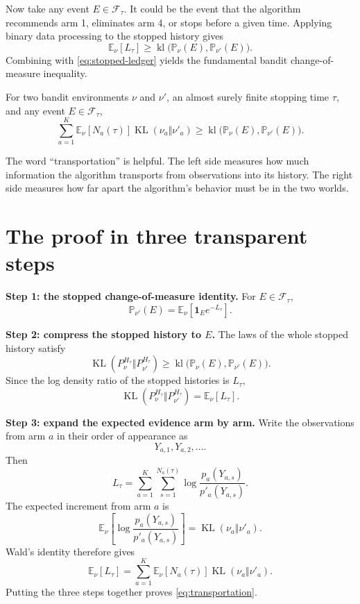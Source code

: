 \documentclass[en,nofont,11pt]{elegantbook}
\newcommand{\E}{\mathbb{E}}
\newcommand{\Pbb}{\mathbb{P}}
\newcommand{\one}{\mathbf{1}}
\newcommand{\KL}{\operatorname{KL}}
\newcommand{\kl}{\operatorname{kl}}
\newcommand{\calF}{\mathcal{F}}
\begin{document}
Now take any event $E\in\calF_\tau$. It could be the event that the algorithm recommends arm 1, eliminates arm 4, or stops before a given time. Applying binary data processing to the stopped history gives
\[
\E_\nu[L_\tau]
\geq
\kl\bigl(\Pbb_\nu(E),\Pbb_{\nu'}(E)\bigr).
\]
Combining with \eqref{eq:stopped-ledger} yields the fundamental bandit change-of-measure inequality.

\begin{resultbox}[title=Bandit transportation inequality]
For two bandit environments $\nu$ and $\nu'$, an almost surely finite stopping time $\tau$, and any event $E\in\calF_\tau$,
\begin{equation}
\boxed{
\sum_{a=1}^{K}
\E_\nu[N_a(\tau)]\KL(\nu_a\Vert\nu'_a)
\geq
\kl\bigl(\Pbb_\nu(E),\Pbb_{\nu'}(E)\bigr).
}
\label{eq:transportation}
\end{equation}
\end{resultbox}

The word ``transportation'' is helpful. The left side measures how much information the algorithm transports from observations into its history. The right side measures how far apart the algorithm's behavior must be in the two worlds.

\section{The proof in three transparent steps}

\textbf{Step 1: the stopped change-of-measure identity.}
For $E\in\calF_\tau$,
\[
\Pbb_{\nu'}(E)
=
\E_\nu\left[\one_E e^{-L_\tau}\right].
\]

\textbf{Step 2: compress the stopped history to $E$.}
The laws of the whole stopped history satisfy
\[
\KL(P_\nu^{H_\tau}\Vert P_{\nu'}^{H_\tau})
\geq
\kl\bigl(\Pbb_\nu(E),\Pbb_{\nu'}(E)\bigr).
\]
Since the log density ratio of the stopped histories is $L_\tau$,
\[
\KL(P_\nu^{H_\tau}\Vert P_{\nu'}^{H_\tau})
=
\E_\nu[L_\tau].
\]

\textbf{Step 3: expand the expected evidence arm by arm.}
Write the observations from arm $a$ in their order of appearance as
\[
Y_{a,1},Y_{a,2},\ldots.
\]
Then
\[
L_\tau
=
\sum_{a=1}^{K}
\sum_{s=1}^{N_a(\tau)}
\log\frac{p_a(Y_{a,s})}{p'_a(Y_{a,s})}.
\]
The expected increment from arm $a$ is
\[
\E_\nu\left[
\log\frac{p_a(Y_{a,s})}{p'_a(Y_{a,s})}
\right]
=
\KL(\nu_a\Vert\nu'_a).
\]
Wald's identity therefore gives
\[
\E_\nu[L_\tau]
=
\sum_{a=1}^{K}
\E_\nu[N_a(\tau)]\KL(\nu_a\Vert\nu'_a).
\]
Putting the three steps together proves \eqref{eq:transportation}.
\end{document}
